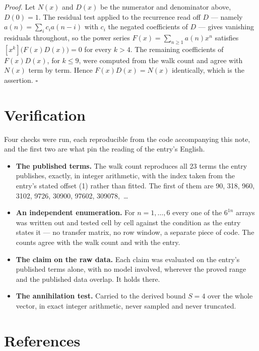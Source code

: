 \documentclass[11pt]{article}
\theoremstyle{definition}
\begin{document}
{\itshape Proof.} Let $N(x)$ and $D(x)$ be the numerator and denominator above, $D(0)=1$. The residual test applied to the recurrence read off $D$ --- namely $a(n) = \sum_i c_i a(n-i)$ with $c_i$ the negated coefficients of $D$ --- gives vanishing residuals throughout, so the power series $F(x)=\sum_{n\ge 1}a(n)x^n$ satisfies $[x^k]\bigl(F(x)D(x)\bigr) = 0$ for every $k > 4$. The remaining coefficients of $F(x)D(x)$, for $k \le 9$, were computed from the walk count and agree with $N(x)$ term by term. Hence $F(x)D(x) = N(x)$ identically, which is the assertion. $\square$

\section{Verification}

Four checks were run, each reproducible from the code accompanying this note, and the first two are what pin the reading of the entry's English.

\begin{itemize}

\item {\bfseries The published terms.} The walk count reproduces all 23 terms the entry publishes, exactly, in integer arithmetic, with the index taken from the entry's stated offset (1) rather than fitted. The first of them are 90, 318, 960, 3102, 9726, 30900, 97602, 309078,~\dots

\item {\bfseries An independent enumeration.} For $n = 1,\dots,6$ every one of the $6^{1n}$ arrays was written out and tested cell by cell against the condition as the entry states it --- no transfer matrix, no row window, a separate piece of code. The counts agree with the walk count and with the entry.

\item {\bfseries The claim on the raw data.} Each claim was evaluated on the entry's published terms alone, with no model involved, wherever the proved range and the published data overlap. It holds there.

\item {\bfseries The annihilation test.} Carried to the derived bound $S = 4$ over the whole vector, in exact integer arithmetic, never sampled and never truncated.

\end{itemize}

\section{References}
\end{document}

